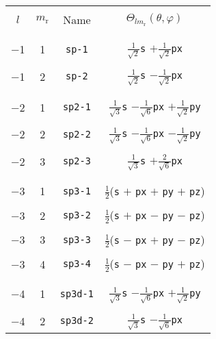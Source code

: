 \begin{table}
\begin{center}
\begin{tabular}{|cccc|}
\hline\hline
&&&\\
$l$ & $m_{\mathrm{r}}$ & Name & $\Theta_{lm_{\mathrm{r}}}(\theta,\varphi)$ \\ 
&&&\\\hline&&&\\
 $-$1  &  1  &  \verb#sp-1#   &  
$\frac{1}{\sqrt{2}}$\verb#s# $+\frac{1}{\sqrt{2}}$\verb#px# \\
&&&\\
 $-$1  &  2  &  \verb#sp-2#   &  
$\frac{1}{\sqrt{2}}$\verb#s# $-\frac{1}{\sqrt{2}}$\verb#px# \\
&&&\\\hline&&&\\
 $-$2  &  1  &  \verb#sp2-1#   &  
$\frac{1}{\sqrt{3}}$\verb#s# $-\frac{1}{\sqrt{6}}$\verb#px#
$+\frac{1}{\sqrt{2}}$\verb#py# \\  
&&&\\
 $-$2  &  2  &  \verb#sp2-2#   &  
$\frac{1}{\sqrt{3}}$\verb#s# $-\frac{1}{\sqrt{6}}$\verb#px#
$-\frac{1}{\sqrt{2}}$\verb#py# \\  
&&&\\
 $-$2  &  3  &  \verb#sp2-3#   &  
$\frac{1}{\sqrt{3}}$\verb#s# $+\frac{2}{\sqrt{6}}$\verb#px# \\
&&&\\\hline&&&\\
 $-$3  &  1  &  \verb#sp3-1#   &  
$\frac{1}{2}$(\verb#s# $+$ \verb#px# $+$ \verb#py# $+$ \verb#pz#) \\ 
&&&\\
 $-$3  &  2  &  \verb#sp3-2#   &  
$\frac{1}{2}$(\verb#s# $+$ \verb#px# $-$ \verb#py# $-$ \verb#pz#) \\ 
&&&\\
 $-$3  &  3  &  \verb#sp3-3#   &  
$\frac{1}{2}$(\verb#s# $-$ \verb#px# $+$ \verb#py# $-$ \verb#pz#) \\ 
&&&\\
 $-$3  &  4  &  \verb#sp3-4#   &  
$\frac{1}{2}$(\verb#s# $-$ \verb#px# $-$ \verb#py# $+$ \verb#pz#) \\ 
&&&\\\hline&&&\\
 $-$4  &  1  &  \verb#sp3d-1#  & 
$\frac{1}{\sqrt{3}}$\verb#s# $-\frac{1}{\sqrt{6}}$\verb#px#
$+\frac{1}{\sqrt{2}}$\verb#py#\\
&&&\\
 $-$4  &  2  &  \verb#sp3d-2#  &
$\frac{1}{\sqrt{3}}$\verb#s# $-\frac{1}{\sqrt{6}}$\verb#px#

\end{tabular}
\end{center}
\end{table}
